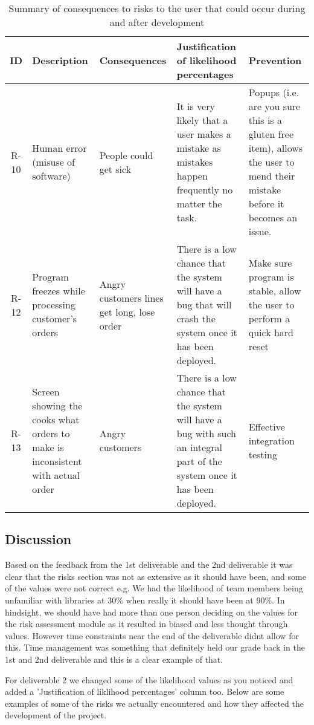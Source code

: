 \begin{table}[!ht]
\centering
\caption{Summary of consequences to risks to the user that could occur during and after development}
\begin{tabularx}{\linewidth}{|c|X|X|X|X|}
	\hline
    ID & Description & Consequences & Justification of likelihood percentages & Prevention \\
    \hline
    R-10 & Human error (misuse of software) & People could get sick & It is very likely that a user makes a mistake as mistakes happen frequently no matter the task. & Popups (i.e. are you sure this is a gluten free item), allows the user to mend their mistake before it becomes an issue. \\
    \hline
    R-12 & Program freezes while processing customer’s orders & Angry customers lines get long, lose order & There is a low chance that the system will have a bug that will crash the system once it has been deployed. & Make sure program is stable, allow the user to perform a quick hard reset \\
    \hline
    R-13 & Screen showing the cooks what orders to make is inconsistent with actual order & Angry customers & There is a low chance that the system will have a bug with such an integral part of the system once it has been deployed. & Effective integration testing \\
    \hline
\end{tabularx}
\end{table}


\subsection{Discussion}

Based on the feedback from the 1st deliverable and the 2nd deliverable it was clear that the risks section was not as extensive as it should have been, and some of the values were not correct e.g. We had the likelihood of team members being unfamiliar with libraries at 30\% when really it should have been at 90\%. In hindsight, we should have had more than one person deciding on the values for the risk assessment module as it resulted in biased and less thought through values. However time constraints near the end of the deliverable didnt allow for this. Time management was something that definitely held our grade back in the 1st and 2nd deliverable and this is a clear example of that.

For deliverable 2 we changed some of the likelihood values as you noticed and added a 'Justification of liklihood percentages' column too. Below are some examples of some of the risks we actually encountered and how they affected the development of the project.

